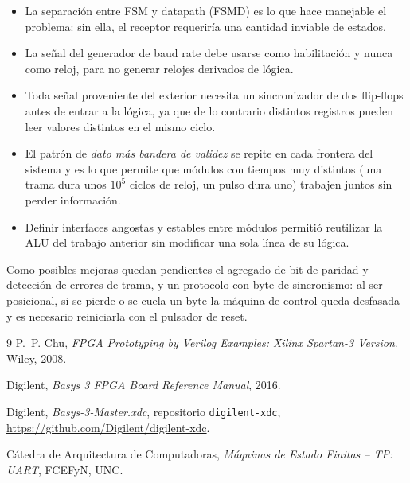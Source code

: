 \documentclass[12pt,a4paper]{article}
\begin{document}
\begin{itemize}[nosep]
  \item La separación entre FSM y datapath (FSMD) es lo que hace manejable el
        problema: sin ella, el receptor requeriría una cantidad inviable de
        estados.
  \item La señal del generador de baud rate debe usarse como habilitación y
        nunca como reloj, para no generar relojes derivados de lógica.
  \item Toda señal proveniente del exterior necesita un sincronizador de dos
        flip-flops antes de entrar a la lógica, ya que de lo contrario distintos
        registros pueden leer valores distintos en el mismo ciclo.
  \item El patrón de \emph{dato más bandera de validez} se repite en cada
        frontera del sistema y es lo que permite que módulos con tiempos muy
        distintos (una trama dura unos $10^5$ ciclos de reloj, un pulso dura uno)
        trabajen juntos sin perder información.
  \item Definir interfaces angostas y estables entre módulos permitió reutilizar
        la ALU del trabajo anterior sin modificar una sola línea de su lógica.
\end{itemize}

Como posibles mejoras quedan pendientes el agregado de bit de paridad y
detección de errores de trama, y un protocolo con byte de sincronismo: al ser
posicional, si se pierde o se cuela un byte la máquina de control queda desfasada
y es necesario reiniciarla con el pulsador de reset.

\begin{thebibliography}{9}
P.~P. Chu, \emph{FPGA Prototyping by Verilog Examples: Xilinx Spartan-3 Version}.
Wiley, 2008.

Digilent, \emph{Basys 3 FPGA Board Reference Manual}, 2016.

Digilent, \emph{Basys-3-Master.xdc}, repositorio \texttt{digilent-xdc},
\url{https://github.com/Digilent/digilent-xdc}.

Cátedra de Arquitectura de Computadoras, \emph{Máquinas de Estado Finitas --
TP: UART}, FCEFyN, UNC.
\end{thebibliography}
\end{document}

